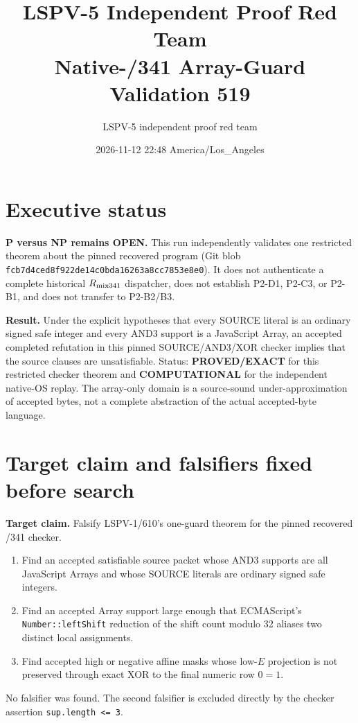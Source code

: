 \documentclass[11pt]{article}
\title{LSPV-5 Independent Proof Red Team\\Native-/341 Array-Guard Validation 519}
\author{LSPV-5 independent proof red team}
\date{2026-11-12 22:48 America/Los\_Angeles}
\newcommand{\EXACT}{\textbf{PROVED/EXACT}}
\newcommand{\COMP}{\textbf{COMPUTATIONAL}}
\begin{document}
\maketitle

\section*{Executive status}
\noindent
\textbf{P versus NP remains OPEN.}  This run independently validates one
restricted theorem about the pinned recovered
 program (Git blob
\texttt{fcb7d4ced8f922de14c0bda16263a8cc7853e8e0}).  It does not authenticate a
complete historical $R_{\rm mix341}$ dispatcher, does not establish P2-D1,
P2-C3, or P2-B1, and does not transfer to P2-B2/B3.

\medskip\noindent
\textbf{Result.}  Under the explicit hypotheses that every SOURCE literal is
an ordinary signed safe integer and every AND3 support is a JavaScript Array,
an accepted completed refutation in this pinned SOURCE/AND3/XOR checker implies
that the source clauses are unsatisfiable.  Status: \EXACT{} for this restricted
checker theorem and \COMP{} for the independent native-OS replay.  The
array-only domain is a source-sound under-approximation of accepted bytes, not
a complete abstraction of the actual accepted-byte language.

\section*{Target claim and falsifiers fixed before search}
\noindent
\textbf{Target claim.}  Falsify LSPV-1/610's one-guard theorem for the pinned
recovered /341 checker.

\begin{enumerate}
\item Find an accepted satisfiable source packet whose AND3 supports are all
JavaScript Arrays and whose SOURCE literals are ordinary signed safe integers.
\item Find an accepted Array support large enough that ECMAScript's
\texttt{Number::leftShift} reduction of the shift count modulo 32 aliases two
distinct local assignments.
\item Find accepted high or negative affine masks whose low-$E$ projection is
not preserved through exact XOR to the final numeric row $0=1$.
\end{enumerate}
No falsifier was found.  The second falsifier is excluded directly by the
checker assertion \texttt{sup.length <= 3}.
\end{document}
